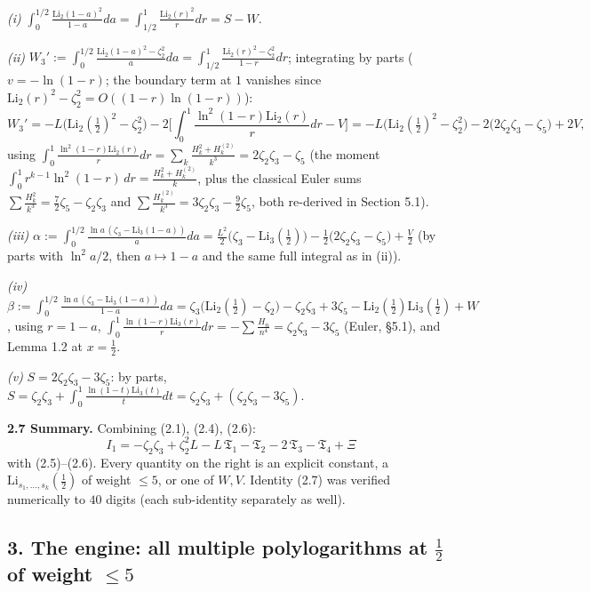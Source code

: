 \documentclass[11pt]{article}
\theoremstyle{remark}
\begin{document}
\textit{(i)} $\int_0^{1/2}\frac{\mathrm{Li}_2(1-a)^2}{1-a}da=\int_{1/2}^1\frac{\mathrm{Li}_2(r)^2}{r}dr=S-W$.

\textit{(ii)} $W_3':=\int_0^{1/2}\frac{\mathrm{Li}_2(1-a)^2-\zeta_2^2}{a}da
=\int_{1/2}^1\frac{\mathrm{Li}_2(r)^2-\zeta_2^2}{1-r}dr$; integrating by parts ($v=-\ln(1-r)$; the boundary term at $1$ vanishes since $\mathrm{Li}_2(r)^2-\zeta_2^2=O((1-r)\ln(1-r))$):
\[
W_3'=-L\big(\mathrm{Li}_2(\tfrac12)^2-\zeta_2^2\big)-2\Big[\int_0^1\frac{\ln^2(1-r)\mathrm{Li}_2(r)}{r}dr-V\Big]
=-L\big(\mathrm{Li}_2(\tfrac12)^2-\zeta_2^2\big)-2\big(2\zeta_2\zeta_3-\zeta_5\big)+2V,
\]
using $\int_0^1\frac{\ln^2(1-r)\mathrm{Li}_2(r)}{r}dr=\sum_k\frac{H_k^2+H_k^{(2)}}{k^3}=2\zeta_2\zeta_3-\zeta_5$
(the moment $\int_0^1r^{k-1}\ln^2(1-r)\,dr=\frac{H_k^2+H_k^{(2)}}{k}$, plus the classical Euler sums
$\sum\frac{H_k^2}{k^3}=\frac72\zeta_5-\zeta_2\zeta_3$ and $\sum\frac{H^{(2)}_k}{k^3}=3\zeta_2\zeta_3-\frac92\zeta_5$, both re-derived in Section 5.1).

\textit{(iii)} $\alpha:=\int_0^{1/2}\frac{\ln a\,(\zeta_3-\mathrm{Li}_3(1-a))}{a}da
=\frac{L^2}{2}\big(\zeta_3-\mathrm{Li}_3(\tfrac12)\big)-\frac12\big(2\zeta_2\zeta_3-\zeta_5\big)+\frac{V}2$
(by parts with $\ln^2a/2$, then $a\mapsto1-a$ and the same full integral as in (ii)).

\textit{(iv)} $\beta:=\int_0^{1/2}\frac{\ln a\,(\zeta_3-\mathrm{Li}_3(1-a))}{1-a}da
=\zeta_3\big(\mathrm{Li}_2(\tfrac12)-\zeta_2\big)-\zeta_2\zeta_3+3\zeta_5-\mathrm{Li}_2(\tfrac12)\mathrm{Li}_3(\tfrac12)+W$,
using $r=1-a$, $\int_0^1\frac{\ln(1-r)\mathrm{Li}_3(r)}{r}dr=-\sum\frac{H_n}{n^4}=\zeta_2\zeta_3-3\zeta_5$ (Euler, \S5.1), and Lemma 1.2 at $x=\tfrac12$.

\textit{(v)} $S=2\zeta_2\zeta_3-3\zeta_5$: by parts, $S=\zeta_2\zeta_3+\int_0^1\frac{\ln(1-t)\mathrm{Li}_3(t)}{t}dt=\zeta_2\zeta_3+(\zeta_2\zeta_3-3\zeta_5)$.

\textbf{2.7 Summary.} Combining (2.1), (2.4), (2.6):
\begin{equation*}
\boxed{\;I_1=-\zeta_2\zeta_3+\zeta_2^2L-L\,\mathfrak T_1-\mathfrak T_2-2\,\mathfrak T_3-\mathfrak T_4+\Xi\;} \tag{2.7}
\end{equation*}
with (2.5)--(2.6). Every quantity on the right is an explicit constant, a $\mathrm{Li}_{s_1,\dots,s_k}(\tfrac12)$ of weight $\le5$, or one of $W,V$. Identity (2.7) was verified numerically to $40$ digits (each sub-identity separately as well).

\subsection*{3. The engine: all multiple polylogarithms at $\tfrac12$ of weight $\le5$}
\end{document}
